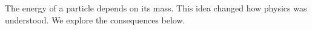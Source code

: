\documentclass{article}
\begin{document}
The energy of a particle depends on its mass.
This idea changed how physics was understood.
We explore the consequences below.
\end{document}
